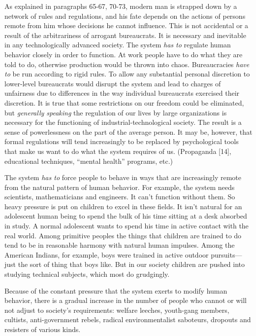  As explained in paragraphs 65-67, 70-73, modern man is strapped down by a network of rules and regulations, and his fate depends on the actions of persons remote from him whose decisions he cannot influence. This is not accidental or a result of the arbitrariness of arrogant bureaucrats. It is necessary and inevitable in any technologically advanced society. The system {\em has to} regulate human behavior closely in order to function. At work people have to do what they are told to do, otherwise production would be thrown into chaos. Bureaucracies {\em have to} be run according to rigid rules. To allow any substantial personal discretion to lower-level bureaucrats would disrupt the system and lead to charges of unfairness due to differences in the way individual bureaucrats exercised their discretion. It is true that some restrictions on our freedom could be eliminated, but {\em generally speaking} the regulation of our lives by large organizations is necessary for the functioning of industrial-technological society. The result is a sense of powerlessness on the part of the average person. It may be, however, that formal regulations will tend increasingly to be replaced by psychological tools that make us want to do what the system requires of us. (Propaganda [14], educational techniques, “mental health” programs, etc.)

 The system {\em has to} force people to behave in ways that are increasingly remote from the natural pattern of human behavior. For example, the system needs scientists, mathematicians and engineers. It can’t function without them. So heavy pressure is put on children to excel in these fields. It isn’t natural for an adolescent human being to spend the bulk of his time sitting at a desk absorbed in study. A normal adolescent wants to spend his time in active contact with the real world. Among primitive peoples the things that children are trained to do tend to be in reasonable harmony with natural human impulses. Among the American Indians, for example, boys were trained in active outdoor pursuits—
just the sort of thing that boys like. But in our society children are pushed into studying technical subjects, which most do grudgingly.

 Because of the constant pressure that the system exerts to modify human behavior, there is a gradual increase in the number of people who cannot or will not adjust to society’s requirements: welfare leeches, youth-gang members, cultists, anti-government rebels, radical environmentalist saboteurs, dropouts and resisters of various kinds.

